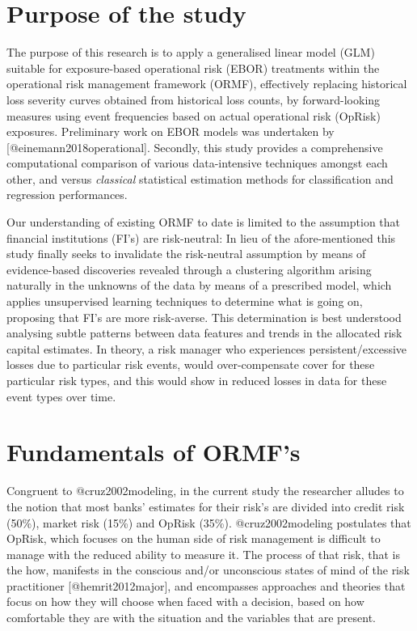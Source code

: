 \documentclass[]{article}
\title{}
\author{}
\date{}
\begin{document}
\doublespacing

\section{Purpose of the study}
\label{sec:Purpose of the study}

The purpose of this research is to apply a generalised linear model
(GLM) suitable for exposure-based operational risk (EBOR) treatments
within the operational risk management framework (ORMF), effectively
replacing historical loss severity curves obtained from historical loss
counts, by forward-looking measures using event frequencies based on
actual operational risk (OpRisk) exposures. Preliminary work on EBOR
models was undertaken by {[}@einemann2018operational{]}. Secondly, this
study provides a comprehensive computational comparison of various
data-intensive techniques amongst each other, and versus
\emph{classical} statistical estimation methods for classification and
regression performances.\medskip

Our understanding of existing ORMF to date is limited to the assumption
that financial institutions (FI's) are risk-neutral: In lieu of the
afore-mentioned this study finally seeks to invalidate the risk-neutral
assumption by means of evidence-based discoveries revealed through a
clustering algorithm arising naturally in the unknowns of the data by
means of a prescribed model, which applies unsupervised learning
techniques to determine what is going on, proposing that FI's are more
risk-averse. This determination is best understood analysing subtle
patterns between data features and trends in the allocated risk capital
estimates. In theory, a risk manager who experiences
persistent/excessive losses due to particular risk events, would
over-compensate cover for these particular risk types, and this would
show in reduced losses in data for these event types over time.

\section{Fundamentals of ORMF's}
\label{sec:Fundamentals of ORMF's}

Congruent to @cruz2002modeling, in the current study the researcher
alludes to the notion that most banks' estimates for their risk's are
divided into credit risk (50\%), market risk (15\%) and OpRisk (35\%).
@cruz2002modeling postulates that OpRisk, which focuses on the human
side of risk management is difficult to manage with the reduced ability
to measure it. The process of that risk, that is the how, manifests in
the conscious and/or unconscious states of mind of the risk practitioner
{[}@hemrit2012major{]}, and encompasses approaches and theories that
focus on how they will choose when faced with a decision, based on how
comfortable they are with the situation and the variables that are
present.
\end{document}
